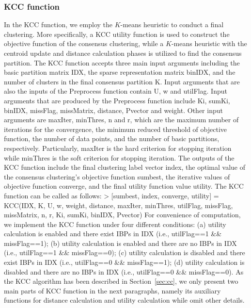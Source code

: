 \documentclass[acmsmall,screen,review]{acmart}
\begin{document}
\subsubsection[KCC function]{\textsf{KCC} function} 
In the \textsf{KCC} function, we employ the $K$-means heuristic to conduct a final clustering. More specifically, a KCC utility function is used to construct the objective function of the consensus clustering, while a $K$-means heuristic with the centroid update and distance calculation phases is utilized to find the consensus partition. The \textsf{KCC} function accepts three main input arguments including the basic partition matrix \textsf{IDX}, the sparse representation matrix \textsf{binIDX}, and the number of clusters in the final consensus partition \textsf{K}. Input arguments that are also the inputs of the \textsf{Preprocess} function contain \textsf{U}, \textsf{w} and \textsf{utilFlag}. Input arguments that are produced by the \textsf{Preprocess} function include \textsf{Ki}, \textsf{sumKi}, \textsf{binIDX}, \textsf{missFlag}, \textsf{missMatrix}, \textsf{distance}, \textsf{Pvector} and \textsf{weight}. Other input arguments are \textsf{maxIter}, \textsf{minThres}, \textsf{n} and \textsf{r}, which are the maximum number of iterations for the convergence, the minimum reduced threshold of objective function, the number of data points, and the number of basic partitions, respectively. Particularly, \textsf{maxIter} is the hard criterion for stopping iteration while \textsf{minThres} is the soft criterion for stopping iteration. The outputs of the \textsf{KCC} function include the final clustering label vector \textsf{index}, the optimal value of the consensus clustering's objective function \textsf{sumbest}, the iterative values of objective function \textsf{converge}, and the final utility function value \textsf{utility}. The \textsf{KCC} function can be called as follows:
\newline
\newline
\textsf{> [sumbest, index, converge, utility] = KCC(IDX, K, U, w, weight, distance, maxIter, minThres, utilFlag, missFlag, missMatrix, n, r, Ki, sumKi, binIDX, Pvector)}
\newline
\newline
For convenience of computation, we implement the \textsf{KCC} function under four different conditions: (a) utility calculation is enabled and there exist IBPs in \textsf{IDX} (i.e., \textsf{utilFlag==1 \&\& missFlag==1}); (b) utility calculation is enabled and there are no IBPs in \textsf{IDX} (i.e., \textsf{utilFlag==1 \&\& missFlag==0}); (c) utility calculation is disabled and there exist IBPs in \textsf{IDX} (i.e., \textsf{utilFlag==0 \&\& missFlag==1}); (d) utility calculation is disabled and there are no IBPs in \textsf{IDX} (i.e., \textsf{utilFlag==0 \&\& missFlag==0}). As the KCC algorithm has been described in Section~\ref{sec:cc}, we only present two main parts of \textsf{KCC} function in the next paragraphs, namely its auxiliary functions for distance calculation and utility calculation while omit other details.
\end{document}
